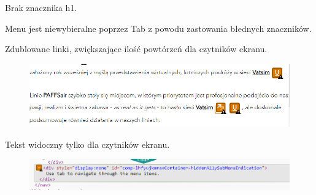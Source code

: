 \documentclass[12pt,oneside,a4paper]{book} %
\theoremstyle{break}
\begin{document}
Brak znacznika h1.

Menu jest niewybieralne poprzez Tab z powodu zastowania błednych znaczników.

Zdublowane linki, zwiększające ilość powtórzeń dla czytników ekranu.
\begin{figure}[H]
  \centering
  \includegraphics[width=1\textwidth]{paffsair/reduntant-links.png}
\end{figure}

Tekst widoczny tylko dla czytników ekranu.
\begin{figure}[H]
  \centering
  \includegraphics[width=1\textwidth]{paffsair/text-hidden.png}
\end{figure}
\end{document}
